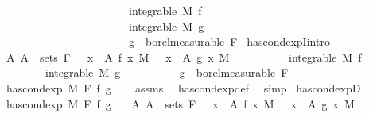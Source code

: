 \begin{isabellebody}
\ \ \ \ \ \ \ \ \ \ \ \ \ \ \ \ \ \ \ \ \ \ \ \ {\isasymand}\ integrable\ M\ f\ \isanewline
\ \ \ \ \ \ \ \ \ \ \ \ \ \ \ \ \ \ \ \ \ \ \ \ {\isasymand}\ integrable\ M\ g\ \isanewline
\ \ \ \ \ \ \ \ \ \ \ \ \ \ \ \ \ \ \ \ \ \ \ \ {\isasymand}\ g\ {\isasymin}\ borel{\isacharunderscore}{\kern0pt}measurable\ F{\isacharparenright}{\kern0pt}{\isachardoublequoteclose}\isanewline
\isanewline
{}\isamarkupfalse%
\ has{\isacharunderscore}{\kern0pt}cond{\isacharunderscore}{\kern0pt}expI{\isacharprime}{\kern0pt}{\isacharbrackleft}{\kern0pt}intro{\isacharbrackright}{\kern0pt}{\isacharcolon}{\kern0pt}\isanewline
\ \ \ {\isachardoublequoteopen}{\isasymAnd}A{\isachardot}{\kern0pt}\ A\ {\isasymin}\ sets\ F\ {\isasymLongrightarrow}\ {\isacharparenleft}{\kern0pt}{\isasymintegral}\ x\ {\isasymin}\ A{\isachardot}{\kern0pt}\ f\ x\ {\isasympartial}M{\isacharparenright}{\kern0pt}\ {\isacharequal}{\kern0pt}\ {\isacharparenleft}{\kern0pt}{\isasymintegral}\ x\ {\isasymin}\ A{\isachardot}{\kern0pt}\ g\ x\ {\isasympartial}M{\isacharparenright}{\kern0pt}{\isachardoublequoteclose}\isanewline
\ \ \ \ \ \ \ \ \ \ {\isachardoublequoteopen}integrable\ M\ f{\isachardoublequoteclose}\isanewline
\ \ \ \ \ \ \ \ \ \ {\isachardoublequoteopen}integrable\ M\ g{\isachardoublequoteclose}\isanewline
\ \ \ \ \ \ \ \ \ \ {\isachardoublequoteopen}g\ {\isasymin}\ borel{\isacharunderscore}{\kern0pt}measurable\ F{\isachardoublequoteclose}\isanewline
\ \ \ {\isachardoublequoteopen}has{\isacharunderscore}{\kern0pt}cond{\isacharunderscore}{\kern0pt}exp\ M\ F\ f\ g{\isachardoublequoteclose}\isanewline
%
\isadelimproof
\ \ %
\endisadelimproof
%
\isatagproof
{}\isamarkupfalse%
\ assms\ \isamarkupfalse%
\ has{\isacharunderscore}{\kern0pt}cond{\isacharunderscore}{\kern0pt}exp{\isacharunderscore}{\kern0pt}def\ \isamarkupfalse%
\ simp%
\endisatagproof
{\isafoldproof}%
%
\isadelimproof
\isanewline
%
\endisadelimproof
\isanewline
{}\isamarkupfalse%
\ has{\isacharunderscore}{\kern0pt}cond{\isacharunderscore}{\kern0pt}expD{\isacharcolon}{\kern0pt}\isanewline
\ \ \ {\isachardoublequoteopen}has{\isacharunderscore}{\kern0pt}cond{\isacharunderscore}{\kern0pt}exp\ M\ F\ f\ g{\isachardoublequoteclose}\isanewline
\ \ \ {\isachardoublequoteopen}{\isasymAnd}A{\isachardot}{\kern0pt}\ A\ {\isasymin}\ sets\ F\ {\isasymLongrightarrow}\ {\isacharparenleft}{\kern0pt}{\isasymintegral}\ x\ {\isasymin}\ A{\isachardot}{\kern0pt}\ f\ x\ {\isasympartial}M{\isacharparenright}{\kern0pt}\ {\isacharequal}{\kern0pt}\ {\isacharparenleft}{\kern0pt}{\isasymintegral}\ x\ {\isasymin}\ A{\isachardot}{\kern0pt}\ g\ x\ {\isasympartial}M{\isacharparenright}{\kern0pt}{\isachardoublequoteclose}\isanewline

\end{isabellebody}
